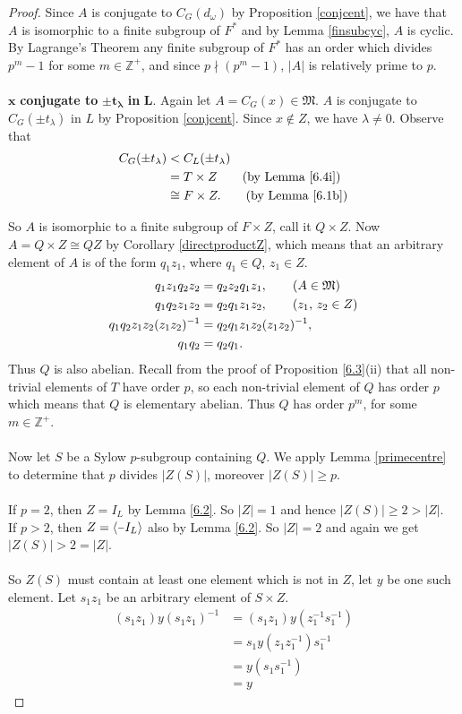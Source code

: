 \documentclass[a4paper , 11pt]{book}
\newcommand{\minus}{\scalebox{0.75}[1.0]{$-$}}
\theoremstyle{definition}
\theoremstyle{remark}
\begin{document}
\begin{proof}
Since $A$ is conjugate to $C_G(d_\omega)$ by Proposition \ref{conjcent}, we have that $A$ is isomorphic to a finite subgroup of $F^*$ and by Lemma \ref{finsubcyc}, $A$ is cyclic. By Lagrange's Theorem any finite subgroup of $F^*$ has an order which divides $p^m - 1$ for some $m \in \mathbb{Z}^+$, and since $p \nmid (p^m - 1)$, $|A|$ is relatively prime to $p$. \\
\\
\textbullet \space $\pmb{x}$ \textbf{conjugate to} $\pmb{\pm t_\lambda}$ \textbf{in} $\pmb{L}$. Again let $A = C_G(x) \in \mathfrak{M}$. $A$ is conjugate to $C_G({\pm t_\lambda})$ in $L$ by Proposition \ref{conjcent}. Since $x \notin Z$, we have $\lambda \neq 0$. Observe that
\begin{align*}  C_G({\pm t_\lambda}) &<  C_L({\pm t_\lambda})
\\&= T \times Z  \tag{by Lemma \ref{6.4i}}
\\&\cong F \times Z. \tag{by Lemma \ref{6.1b}}
\end{align*}

So $A$ is isomorphic to a finite subgroup of $F \times Z$, call it $Q \times Z$. Now $A = Q \times Z \cong QZ$ by Corollary \ref{directproductZ}, which means that an arbitrary element of $A$ is of the form $q_1z_1$, where $q_1 \in Q$, $z_1 \in Z$.
\begin{align*} q_1z_1q_2z_2 &= q_2z_2 q_1z_1, \tag{$A \in \mathfrak{M}$}
\\ q_1q_2z_1z_2 &= q_2q_1z_1z_2, \tag{$z_1$, $z_2 \in Z$}
\\  q_1q_2z_1z_2(z_1z_2)^{-1} &= q_2q_1z_1z_2(z_1z_2)^{-1},
\\ q_1q_2 &= q_2q_1.
\end{align*}
Thus $Q$ is also abelian. Recall from the proof of Proposition \ref{6.3}(ii) that all non-trivial elements of $T$ have order $p$, so each non-trivial element of $Q$ has order $p$ which means that $Q$ is elementary abelian. Thus $Q$ has order $p^m$, for some $m \in \mathbb{Z}^+$. \\
\\
Now let $S$ be a Sylow $p$-subgroup containing $Q$. We apply Lemma \ref{primecentre} to determine that $p$ divides $|Z(S)|$, moreover $|Z(S)| \geq p$. \\
\\
If $p=2$, then $Z=I_L$ by Lemma \ref{6.2}. So $|Z| = 1$ and hence $|Z(S)| \geq 2 > |Z|$.\\
If $p > 2$, then  $Z = \langle \minus I_L \rangle$ also by Lemma \ref{6.2}. So $|Z| = 2$ and again we get $|Z(S)| > 2 = |Z|$. \\
\\
So $Z(S)$ must contain at least one element which is not in $Z$, let $y$ be one such element. Let $s_1z_1$ be an arbitrary element of $S \times Z$.
\begin{align*}
(s_1z_1)y(s_1z_1)^{-1} &= (s_1z_1)y(z_1^{-1}s_1^{-1})
\\ &= s_1y(z_1z_1^{-1})s_1^{-1} \tag{since $y \in L$, $z_1 \in Z$}
\\ &= y(s_1s_1^{-1}) \tag{since $s_1 \in S$, $y \in Z(S)$}
\\ &= y
\end{align*}


\end{proof}
\end{document}
